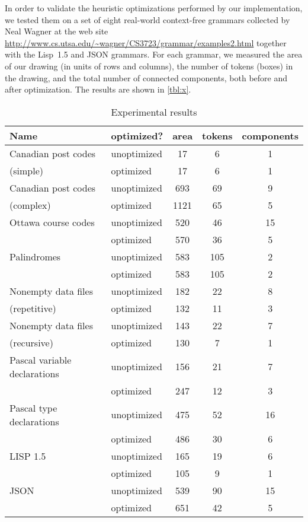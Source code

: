 \documentclass[10pt]{llncs}
\begin{document}
In order to validate the heuristic optimizations performed by our implementation, we tested them on a set of eight real-world context-free grammars collected by Neal Wagner at the web site \url{http://www.cs.utsa.edu/~wagner/CS3723/grammar/examples2.html} together with the Lisp~1.5 and JSON grammars. For each grammar, we measured the area of our drawing (in units of rows and columns), the number of tokens (boxes) in the drawing, and the total number of connected components, both before and after optimization. The results are shown in \autoref{tbl:x}.

\begin{table}
\begin{center}
  \begin{tabular}{| l | l | c | c | c |}
    \hline
    	\textbf{Name} & \textbf{optimized?} & \textbf{area} & \textbf{tokens} & \textbf{components} \\ \hline
	Canadian post codes & unoptimized & 17 & 6 & 1 \\
	(simple) & optimized & 17 & 6 & 1 \\ \hline
	Canadian post codes & unoptimized  & 693 & 69 & 9 \\
	(complex) & optimized & 1121 & 65 & 5 \\ \hline
	Ottawa course codes & unoptimized & 520 &  46 & 15 \\
	& optimized & 570 & 36 & 5 \\ \hline
	Palindromes & unoptimized & 583 & 105 & 2 \\
	& optimized & 583 & 105 & 2 \\ \hline
	Nonempty data files & unoptimized & 182 & 22 & 8 \\
	(repetitive) & optimized  & 132 & 11 & 3 \\ \hline
	Nonempty data files & unoptimized & 143 & 22 & 7 \\
	(recursive) & optimized & 130 & 7 & 1 \\ \hline
	Pascal variable declarations & unoptimized & 156 & 21 & 7 \\
	& optimized & 247 & 12 & 3 \\ \hline
	Pascal type declarations & unoptimized & 475 & 52 & 16 \\
	& optimized & 486 & 30 & 6 \\ \hline
	LISP 1.5 & unoptimized & 165 & 19 & 6 \\
	& optimized & 105 & 9 & 1 \\ \hline
	JSON & unoptimized & 539 & 90 & 15 \\
	& optimized & 651 & 42 & 5 \\ \hline
  \end{tabular}
\end{center}
\caption{Experimental results}
\label{tbl:x}
\end{table}
\end{document}
